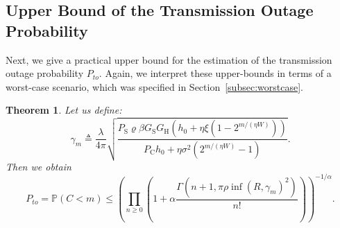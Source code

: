 \documentclass[12pt,draftclsnofoot,onecolumn]{IEEEtran}
\newtheorem{theorem}{Theorem}
\begin{document}
\subsection{Upper Bound of the Transmission Outage Probability}
 
  
Next, we give a practical upper bound for the estimation of the transmission outage probability $P_{to}$. Again, we interpret these upper-bounds in terms of a worst-case scenario, which was specified in Section~\ref{subsec:worstcase}. 
\begin{theorem}
\label{thm:transmissionoutage}
Let us define:
\begin{equation}
\label{eq:gammam}
	\gamma_m\triangleq \frac\lambda{4\pi}\sqrt{ \frac{P_{\mathrm S}\varrho\beta G_{\mathrm{S}} G_{\mathrm{H}}\left(h_0+\eta\xi\left(1-2^{m/(\eta W)}\right)\right)}{P_{\mathrm C}h_0+\eta\sigma^2\left(2^{m/(\eta W)}-1\right)}}.
\end{equation}
Then we obtain
\begin{equation}
\label{eq:boundpsi}
	P_{to} = \mathbb{P} \left(	C	<	m	\right)
	\le  \left(\prod_{n\ge 0} \left(1+\alpha  \frac{\Gamma(n+1,  \pi\rho\inf(R,\gamma_m)^2)}{n!}\right)\right)^{-1/\alpha}.
\end{equation}
\end{theorem}
\end{document}
